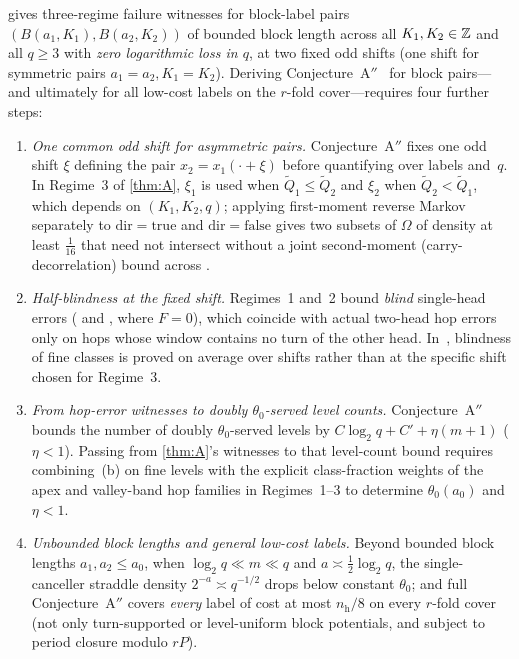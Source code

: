 \begin{remark}\label{rem:scope-A}
 gives three-regime failure witnesses for block-label pairs $(B(a_1, K_1), B(a_2, K_2))$ of bounded block
length across all $K_1, K_2 \in \mathbb{Z}$ and all $q \ge 3$ with \emph{zero logarithmic loss in $q$}, at two fixed odd shifts
(one shift for symmetric pairs $a_1 = a_2, K_1 = K_2$). Deriving Conjecture~A$''$~\cite[Section~5.6, Conjecture~5.24]{EighthPaper2026}
for block pairs---and ultimately for all low-cost labels on the $r$-fold cover---requires four further steps:
\begin{enumerate}[label=(\alph*)]
\item \emph{One common odd shift for asymmetric pairs.} Conjecture~A$''$ fixes one odd shift $\xi$ defining the pair
  $x_2 = x_1(\cdot + \xi)$ before quantifying over labels and~$q$. In Regime~3 of \cref{thm:A}, $\xi_1$ is used when
  $\tilde{Q}_1 \le \tilde{Q}_2$ and $\xi_2$ when $\tilde{Q}_2 < \tilde{Q}_1$, which depends on $(K_1, K_2, q)$; applying
  first-moment reverse Markov separately to $\mathrm{dir} = \mathrm{true}$ and $\mathrm{dir} = \mathrm{false}$ gives two
  subsets of $\Omega$ of density at least $\tfrac{1}{16}$ that need not intersect without a joint second-moment
  (carry-decorrelation) bound across .
\item \emph{Half-blindness at the fixed shift.} Regimes~1 and~2 bound \emph{blind} single-head errors (
  and , where $F = 0$), which coincide with actual two-head hop errors only on hops whose window contains
  no turn of the other head. In~\cite[Proposition~5.17 and Corollary~5.18]{EighthPaper2026}, blindness of fine classes is
  proved on average over shifts rather than at the specific shift chosen for Regime~3.
\item \emph{From hop-error witnesses to doubly $\theta_0$-served level counts.} Conjecture~A$''$ bounds the number of doubly
  $\theta_0$-served levels by $C\log_2 q + C' + \eta(m+1)$ ($\eta < 1$). Passing from \cref{thm:A}'s witnesses to that
  level-count bound requires combining~(b) on fine levels with the explicit class-fraction weights of the apex and
  valley-band hop families in Regimes~1--3 to determine $\theta_0(a_0)$ and $\eta < 1$.
\item \emph{Unbounded block lengths and general low-cost labels.} Beyond bounded block lengths $a_1, a_2 \le a_0$, when
  $\log_2 q \ll m \ll q$ and $a \asymp \tfrac{1}{2}\log_2 q$, the single-canceller straddle density $2^{-a} \asymp q^{-1/2}$
  drops below constant $\theta_0$; and full Conjecture~A$''$ covers \emph{every} label of cost at most $n_{\mathrm{h}}/8$ on
  every $r$-fold cover (not only turn-supported or level-uniform block potentials, and subject to period closure modulo
  $rP$).
\end{enumerate}
\end{remark}

